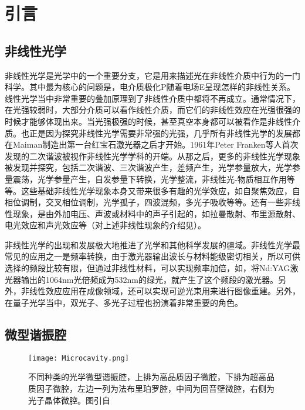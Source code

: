 \chapter{引言}
\label{cha:intro}

\section{非线性光学}

非线性光学是光学中的一个重要分支，它是用来描述光在非线性介质中行为的一门科学。其中最为核心的问题是，电介质极化P随着电场E呈现怎样的非线性关系。线性光学当中非常重要的叠加原理到了非线性介质中都将不再成立。通常情况下，在光强较弱时，大部分介质可以看作线性介质，而它们的非线性效应在光强很强的时候才能够体现出来。当光强极强的时候，甚至真空本身都可以被看作是非线性介质。也正是因为探究非线性光学需要非常强的光强，几乎所有非线性光学的发展都在Maiman制造出第一台红宝石激光器之后才开始\cite{maiman1960stimulated}。1961年Peter Franken等人首次发现的二次谐波被视作非线性光学学科的开端\cite{franken1961generation}。从那之后，更多的非线性光学现象被发现并探究，包括二次谐波、三次谐波产生，差频产生，光学参量放大，光学参量震荡，光学参量产生，自发参量下转换，光学整流，非线性光-物质相互作用等等。这些基础非线性光学现象本身又带来很多有趣的光学效应，如自聚焦效应，自相位调制，交叉相位调制，光学孤子，四波混频，多光子吸收等等。还有一些非线性现象，是由外加电压、声波或材料中的声子引起的，如拉曼散射、布里源散射、电光效应和声光效应等（对上述非线性现象的介绍见\cite{boyd2003nonlinear}）。

非线性光学的出现和发展极大地推进了光学和其他科学发展的疆域。非线性光学最常见的应用之一是频率转换，由于激光器输出波长与材料能级密切相关，所以可供选择的频段比较有限，但通过非线性材料，可以实现频率加倍，如，将Nd:YAG激光器输出的1064nm光倍频成为532nm的绿光，就产生了这个频段的激光器。另外，非线性效应应用在成像领域，还可以实现可逆光束用来进行图像重建。另外，在量子光学当中，双光子、多光子过程也扮演着非常重要的角色\cite{scully1999quantum}。

\section{微型谐振腔}

\begin{figure}
\centering
\texttt{[image: Microcavity.png]}
\caption{不同种类的光学微型谐振腔，上排为高品质因子微腔，下排为超高品质因子微腔，左边一列为法布里珀罗腔，中间为回音壁微腔，右侧为光子晶体微腔。图引自\cite{vahala2003optical}}
\label{pic:Microcavity}
\end{figure}

